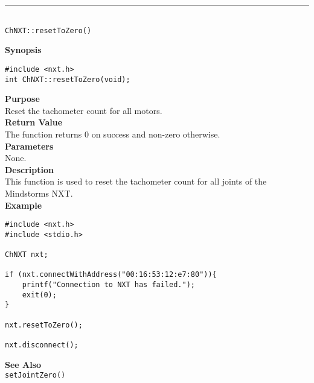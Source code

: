 \noindent
\vspace{5pt}
\rule{4.5in}{0.015in}\\
\noindent
{\LARGE \texttt{ChNXT::resetToZero()} }\\


\noindent
{\bf Synopsis}
\vspace{-8pt}
\begin{verbatim}
#include <nxt.h>
int ChNXT::resetToZero(void);
\end{verbatim}

\noindent
{\bf Purpose}\\
Reset the tachometer count for all motors.\\

\noindent
{\bf Return Value}\\
The function returns 0 on success and non-zero otherwise.\\

\noindent
{\bf Parameters}\\
None.\\

\noindent
{\bf Description}\\
This function is used to reset the tachometer count for 
all joints of the Mindstorms NXT.\\

\noindent
{\bf Example}
\begin{verbatim}
#include <nxt.h> 
#include <stdio.h>

ChNXT nxt;

if (nxt.connectWithAddress("00:16:53:12:e7:80")){
    printf("Connection to NXT has failed.");
    exit(0);
}
    
nxt.resetToZero();

nxt.disconnect();
\end{verbatim}

\noindent
{\bf See Also}\\
\texttt{setJointZero()}\\
